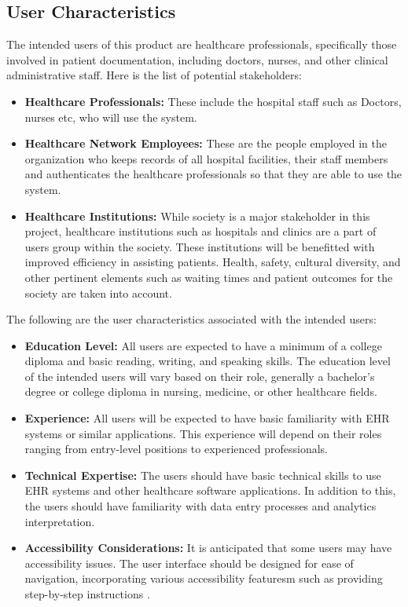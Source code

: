 \documentclass[12pt]{article}
\begin{document}
\subsection{User Characteristics} \label{sec_UserCharacteristics}

The intended users of this product are healthcare professionals, specifically those involved in patient documentation, including doctors, nurses, and other clinical administrative staff. Here is the list of potential stakeholders:\\

\begin{itemize}
  \item\textbf{Healthcare Professionals:} These include the hospital staff such as Doctors, nurses etc, who will use the system.
  \item\textbf{Healthcare Network Employees:} These are the people employed in the organization who keeps records of all hospital facilities, their staff members and authenticates the healthcare professionals so that they are able to use the system.
  \item\textbf{Healthcare Institutions:} While society is a major stakeholder in this project, healthcare institutions such as hospitals and clinics are a part of users group within the society. These institutions will be benefitted with improved efficiency in assisting patients. Health, safety, cultural diversity, and other pertinent elements such as waiting times and patient outcomes for the society are taken into account.  
\end{itemize}

The following are the user characteristics associated with the intended users:\\

\begin{itemize}
  \item\textbf{Education Level:} All users are expected to have a minimum of a college diploma and basic reading, writing, and speaking skills. The education level of the intended users will vary based on their role, generally a bachelor’s degree or college diploma in nursing, medicine, or other healthcare fields. \\
  \item\textbf{Experience:} All users will be expected to have basic familiarity with EHR systems or similar applications. This experience will depend on their roles ranging from entry-level positions to experienced professionals. \\
  \item\textbf{Technical Expertise:} The users should have basic technical skills to use EHR systems and other healthcare software applications. In addition to this, the users should have familiarity with data entry processes and analytics interpretation. \\
  \item\textbf{Accessibility Considerations:} It is anticipated that some users may have accessibility issues. The user interface should be designed for ease of navigation, incorporating various accessibility featuresm such as providing step-by-step instructions .\\
\end{itemize}
\end{document}

